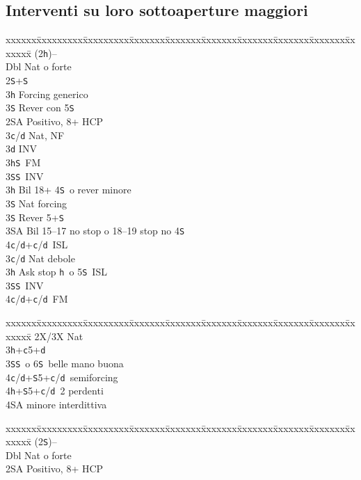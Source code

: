 \documentclass[a4paper,italian]{article}
\newcommand{\BS}{\small{\texttt{S}}}
\newcommand{\BC}{\small{\texttt{c}}}
\newcommand{\BD}{\small{\texttt{d}}}
\newcommand{\BH}{\small{\texttt{h}}}
\newenvironment{bidtable}
{\begin{tabbing}

    xxxxxx\=xxxxxxxxx\=xxxxxxxxx\=xxxxxxx\=xxxxxxx\=xxxxxxx\=xxxxxxx\=xxxxxxx\=xxxxxxx\=xxxxxxx\=\kill}
{\end{tabbing} }%
\begin{document}
\begin{multicols}{2}
    \subsection{Interventi su loro sottoaperture maggiori}

    \begin{bidtable}
        (2\BH)--\+\\
        Dbl \> Nat o forte\+\\
        2\BS{}+\BS\+\\
        3\BH\> Forcing generico\\
        3\BS\> Rever con 5\BS\-\\
        2\small{SA}\> Positivo, 8+ HCP\+\\
        3\BC/\BD \> Nat, NF\+\\
        3\BD\> INV\\
        3\BH{}\BS\ FM\\
        3\BS{}\BS\ INV\-\\
        3\BH\> Bil 18+ 4\BS\ o rever minore\+\\
        3\BS\> Nat forcing\-\\
        3\BS\> Rever 5+\BS\\
        3\small{SA}\> Bil 15--17 no stop o 18--19 stop no 4\BS\\
        4\BC/\BD{}+\BC/\BD\ ISL\-\\
        3\BC/\BD\> Nat debole\\
        3\BH\> Ask stop \BH\ o 5\BS\ ISL\\
        3\BS{}\BS\ INV\\
        4\BC/\BD{}+\BC/\BD\ FM
    \end{bidtable}
    \begin{bidtable}
        \>2X/3X\> Nat\+\\
        3\BH{}+\BC5+\BD\\
        3\BS{}\BS\ o 6\BS\ belle mano buona\\
        4\BC/\BD{}+\BS5+\BC/\BD\ semiforcing\\
        4\BH{}+\BS5+\BC/\BD\ 2 perdenti\\
        4\small{SA} minore interdittiva
    \end{bidtable}
    \vfill\null
    \columnbreak
    \begin{bidtable}
        (2\BS)--\+\\
        Dbl \> Nat o forte\+\\
        2\small{SA}\> Positivo, 8+ HCP\+\\

\end{bidtable}
\end{multicols}
\end{document}
